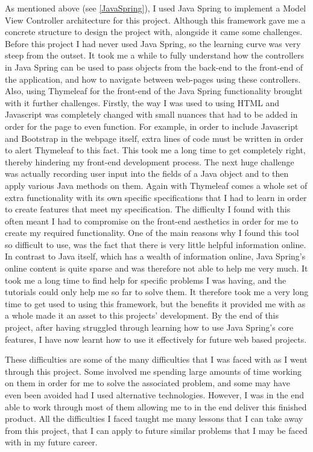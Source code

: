 As mentioned above (see \ref{JavaSpring}), I used Java Spring to implement a Model View Controller architecture for this project. Although this framework gave me a concrete structure to design the project with, alongside it came some challenges. Before this project I had never used Java Spring, so the learning curve was very steep from the outset. It took me a while to fully understand how the controllers in Java Spring can be used to pass objects from the back-end to the front-end of the application, and how to navigate between web-pages using these controllers. Also, using Thymeleaf for the front-end of the Java Spring functionality brought with it further challenges. Firstly, the way I was used to using HTML and Javascript was completely changed with small nuances that had to be added in order for the page to even function. For example, in order to include Javascript and Bootstrap in the webpage itself, extra lines of code must be written in order to alert Thymeleaf to this fact. This took me a long time to get completely right, thereby hindering my front-end development process. The next huge challenge was actually recording user input into the fields of a Java object and to then apply various Java methods on them. Again with Thymeleaf comes a whole set of extra functionality with its own specific specifications that I had to learn in order to create features that meet my specification. The difficulty I found with this often meant I had to compromise on the front-end aesthetics in order for me to create my required functionality. One of the main reasons why I found this tool so difficult to use, was the fact that there is very little helpful information online. In contrast to Java itself, which has a wealth of information online, Java Spring's online content is quite sparse and was therefore not able to help me very much. It took me a long time to find help for specific problems I was having, and the tutorials could only help me so far to solve them. It therefore took me a very long time to get used to using this framework, but the benefits it provided me with as a whole made it an asset to this projects' development. By the end of this project, after having struggled through learning how to use Java Spring's core features, I have now learnt how to use it effectively for future web based projects.

These difficulties are some of the many difficulties that I was faced with as I went through this project. Some involved me spending large amounts of time working on them in order for me to solve the associated problem, and some may have even been avoided had I used alternative technologies. However, I was in the end able to work through most of them allowing me to in the end deliver this finished product. All the difficulties I faced taught me many lessons that I can take away from this project, that I can apply to future similar problems that I may be faced with in my future career. 

